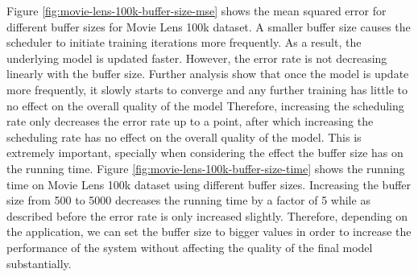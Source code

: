 \documentclass{vldb}
\begin{document}
Figure \ref{fig:movie-lens-100k-buffer-size-mse} shows the mean squared error for different buffer sizes for Movie Lens 100k dataset. 
A smaller buffer size causes the scheduler to initiate training iterations more frequently.
As a result, the underlying model is updated faster.
However, the error rate is not decreasing linearly with the buffer size.
Further analysis show that once the model is update more frequently, it slowly starts to converge and any further training has little to no effect on the overall quality of the model
Therefore, increasing the scheduling rate only decreases the error rate up to a point, after which increasing the scheduling rate has no effect on the overall quality of the model.
This is extremely important, specially when considering the effect the buffer size has on the running time.
Figure \ref{fig:movie-lens-100k-buffer-size-time} shows the running time on Movie Lens 100k dataset using different buffer sizes. 
Increasing the buffer size from 500 to 5000 decreases the running time by a factor of 5 while as described before the error rate is only increased slightly.
Therefore, depending on the application, we can set the buffer size to bigger values in order to increase the performance of the system without affecting the quality of the final model substantially.
\end{document}
